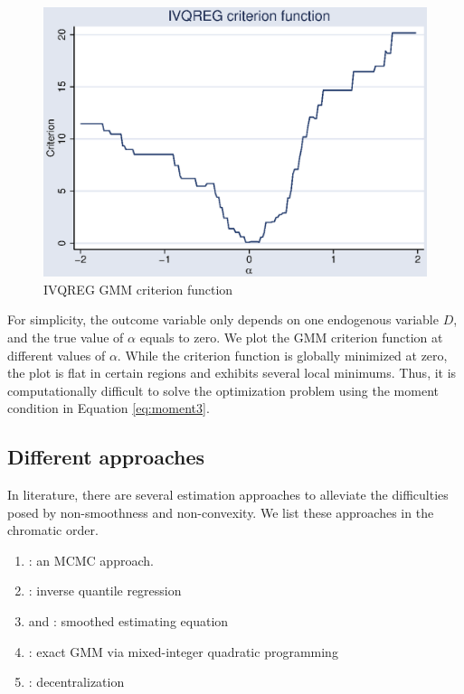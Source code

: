 \begin{figure}[H]
\centering
\label{fig:ivqreg_crit}
\includegraphics[scale=0.8]{eps/ivqreg_obj}
\caption{IVQREG GMM criterion function}
\end{figure}

For simplicity, the outcome variable only depends on one endogenous variable
$D$, and the true value of $\alpha$ equals to zero. We plot the GMM criterion
function at different values of $\alpha$. While the criterion function is
globally minimized at zero, the plot is flat in certain regions and exhibits
several local minimums. Thus, it is computationally difficult to solve the
optimization problem using the moment condition in Equation \ref{eq:moment3}.



\subsection{Different approaches}	

In literature, there are several estimation approaches to alleviate
the difficulties posed by non-smoothness and non-convexity. We list these
approaches in the chromatic order.

\begin{enumerate}
	\item \cite{Chernozhukov2003}: an MCMC approach.
	\item \cite{Chernozhukov2006}: inverse quantile regression
	\item \cite{Kaplan2017} and \cite{DeCastro2019}: smoothed estimating
	  equation
	\item \cite{Chen2018}: exact GMM via mixed-integer quadratic programming
	\item \cite{Kaido2021}: decentralization
\end{enumerate}


